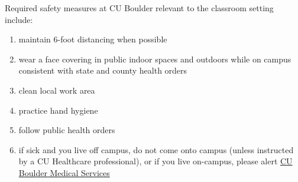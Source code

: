 Required safety measures at CU Boulder relevant to the classroom setting include:
\begin{enumerate}[topsep=0pt,itemsep=0pt,leftmargin=2em,parsep=0pt]
   \item maintain 6-foot distancing when possible
    \item wear a face covering in public indoor spaces and outdoors while on campus consistent with state and county health orders
    \item clean local work area
    \item practice hand hygiene
   \item follow public health orders
   \item if sick and you live off campus, do not come onto campus (unless instructed by a CU Healthcare professional), or if you live on-campus, please alert \href{https://www.colorado.edu/healthcenter/coronavirus-updates/symptoms-and-what-do-if-you-feel-sick}{CU Boulder Medical Services}
\end{enumerate}

